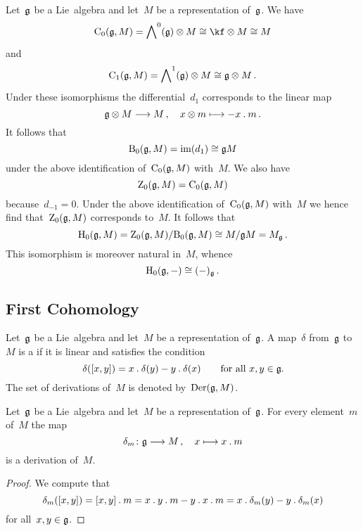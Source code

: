 \begin{fluff}
  Let~$\mathfrak{g}$ be a Lie~algebra and let~$M$ be a representation of~$\mathfrak{g}$.
  We have
  \[
    \Chain_0(\glie, M)
    =
    \Exterior^0(\glie) \otimes M
    \cong
    \kf \otimes M
    \cong
    M
  \]
  and
  \[
    \operatorname{C}_1(\mathfrak{g}, M)
    =
    \operatorname{\bigwedge}^1(\mathfrak{g}) \otimes M
    \cong
    \mathfrak{g} \otimes M \,.
  \]
  Under these isomorphisms the differential~$d_1$ corresponds to the linear map
  \[
    \glie \otimes M
    \to
    M \,,
    \quad
    x \otimes m
    \mapsto
    - x \act m \,.
  \]
  It follows that
  \[
    \operatorname{B}_0(\mathfrak{g}, M)
    =
    \operatorname{im}(d_1)
    \cong
    \mathfrak{g} M
  \]
  under the above identification of~$\operatorname{C}_0(\mathfrak{g}, M)$ with~$M$.
  We also have
  \[
    \operatorname{Z}_0(\mathfrak{g}, M)
    =
    \operatorname{C}_0(\mathfrak{g}, M)
  \]
  because~$d_{-1} = 0$.
  Under the above identification of~$\operatorname{C}_0(\mathfrak{g}, M)$ with~$M$ we hence find that~$\operatorname{Z}_0(\mathfrak{g}, M)$ corresponds to~$M$.
  It follows that
  \[
    \operatorname{H}_0(\mathfrak{g}, M)
    =
    \operatorname{Z}_0(\mathfrak{g}, M) / { \operatorname{B}_0(\mathfrak{g}, M) }
    \cong
    M / \mathfrak{g} M
    =
    M_{\mathfrak{g}} \,.
  \]
  This isomorphism is moreover natural in~$M$, whence
  \[
    \operatorname{H}_0(\mathfrak{g}, -)
    \cong
    (-)_{\mathfrak{g}} \,.
  \]
\end{fluff}



\subsection{First Cohomology}

\begin{definition}
  Let~$\mathfrak{g}$ be a Lie~algebra and let~$M$ be a representation of~$\mathfrak{g}$.
  A map~$\delta$ from~$\mathfrak{g}$ to~$M$ is a  if it is linear and satisfies the condition
  \[
    \delta( [x,y] )
    =
    x \mathbin{.} \delta(y) - y \mathbin{.} \delta(x)
    \qquad
    \text{for all~$x, y \in \mathfrak{g}$.}
  \]
  The set of derivations of~$M$ is denoted by~$\operatorname{Der}(\mathfrak{g}, M)$.
\end{definition}


\begin{proposition}
  \label{inner derivations of representations}
  Let~$\mathfrak{g}$ be a Lie~algebra and let~$M$ be a representation of~$\mathfrak{g}$.
  For every element~$m$ of~$M$ the map
  \[
    \delta_m
    \colon
    \glie
    \to
    M \,,
    \quad
    x
    \mapsto
    x \act m
  \]
  is a derivation of~$M$.
\end{proposition}


\begin{proof}
  We compute that
  \[
    \delta_m([x,y])
    =
    [x,y] \mathbin{.} m
    =
    x \mathbin{.} y \mathbin{.} m - y \mathbin{.} x \mathbin{.} m
    =
    x \mathbin{.} \delta_m(y) - y \mathbin{.} \delta_m(x)
  \]
  for all~$x, y \in \mathfrak{g}$.
\end{proof}


